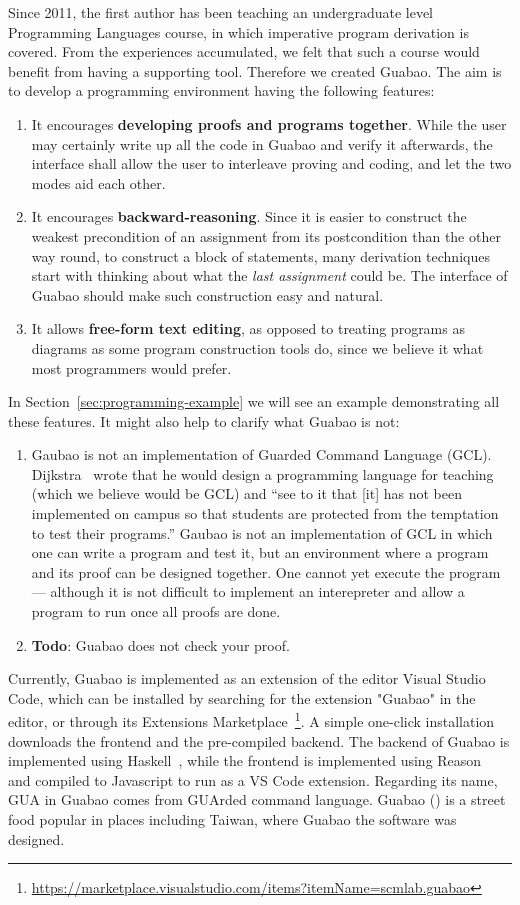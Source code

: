\documentclass[runningheads]{llncs}
\newcommand{\todo}[1]{{\bf Todo}: \lbrack #1 \rbrack}
\begin{document}
Since 2011, the first author has been teaching an undergraduate level Programming Languages course, in which imperative program derivation is covered.
From the experiences accumulated, we felt that such a course would benefit from having a supporting tool.
Therefore we created Guabao.
The aim is to develop a programming environment having the following features:
\begin{enumerate}
\item It encourages {\bf developing proofs and programs together}.
While the user may certainly write up all the code in Guabao and verify it afterwards, the interface shall allow the user to interleave proving and coding, and let the two modes aid each other.
\item It encourages {\bf backward-reasoning}.
Since it is easier to construct the weakest precondition of an assignment from its postcondition than the other way round,
to construct a block of statements, many derivation techniques start with thinking about what the \emph{last assignment} could be.
The interface of Guabao should make such construction easy and natural.
\item It allows {\bf free-form text editing}, as opposed to treating programs as diagrams as some program construction tools do, since we believe it what most programmers would prefer.
\end{enumerate}
In Section~\ref{sec:programming-example} we will see an example demonstrating all these features.
It might also help to clarify what Guabao is not:
\begin{enumerate}
\item Gaubao is not an implementation of Guarded Command Language (GCL).
Dijkstra~\cite{Dijkstra:98:Cruelty} wrote that he would
design a programming language for teaching (which we believe would be GCL) and ``see to it that [it] has not been implemented on campus so that students are protected from the temptation to test their programs.''
Gaubao is not an implementation of GCL in which one can write a program and test it, but an environment where a program and its proof can be designed together.
One cannot yet execute the program --- although it is not difficult to implement an interepreter and allow a program to run once all proofs are done.
\item \todo{Guabao does not check your proof.}
\end{enumerate}

Currently, Guabao is implemented as an extension of the editor Visual Studio Code,
which can be installed by searching for the extension "Guabao" in the editor, or through its Extensions Marketplace~\footnote{\url{https://marketplace.visualstudio.com/items?itemName=scmlab.guabao}}.
A simple one-click installation downloads the frontend and the pre-compiled backend.
The backend of Guabao is implemented using Haskell~\cite{PeytonJones:03:Haskell}, while the frontend is implemented using Reason~\cite{Walke:16:Reason} and compiled to Javascript to run as a VS Code extension.
Regarding its name,
GUA in Guabao comes from GUArded command language.
Guabao () is a street food popular in places including Taiwan, where Guabao the software was designed.
\end{document}
